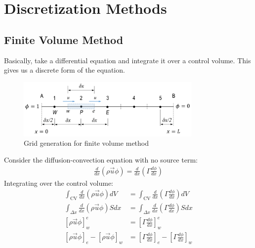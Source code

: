 \section{Discretization Methods}

\subsection{Finite Volume Method}
Basically, take a differential equation and integrate it over a control volume. This gives us a discrete form of the equation.
\begin{figure}[H]
    \centering
    \includegraphics[width=0.8\textwidth]{Section/Figures/mesh generation.png}
    \caption{Grid generation for finite volume method}
\end{figure}
Consider the diffusion-convection equation with no source term:
\begin{align*}
    \frac{d}{dx} (\rho \vec{u} \phi) = \frac{d}{dx} (\Gamma \frac{d\phi}{dx})
\end{align*}
Integrating over the control volume:
\begin{align*}
    \int_{\text{CV}} \frac{d}{dx} (\rho \vec{u} \phi) dV &= \int_{\text{CV}} \frac{d}{dx} (\Gamma \frac{d\phi}{dx}) dV \\
    \int_{\Delta x} \frac{d}{dx} (\rho \vec{u} \phi) S dx &= \int_{\Delta x} \frac{d}{dx} (\Gamma \frac{d\phi}{dx}) S dx \\
    \left[ \rho \vec{u} \phi \right]_{w}^{e} &= \left[ \Gamma \frac{d\phi}{dx} \right]_{w}^{e} \\
    [\rho \vec{u} \phi]_{e} - [\rho \vec{u} \phi]_{w} &= \left[\Gamma \frac{d\phi}{dx} \right]_{e} - \left[\Gamma \frac{d\phi}{dx} \right]_{w} 
\end{align*}

